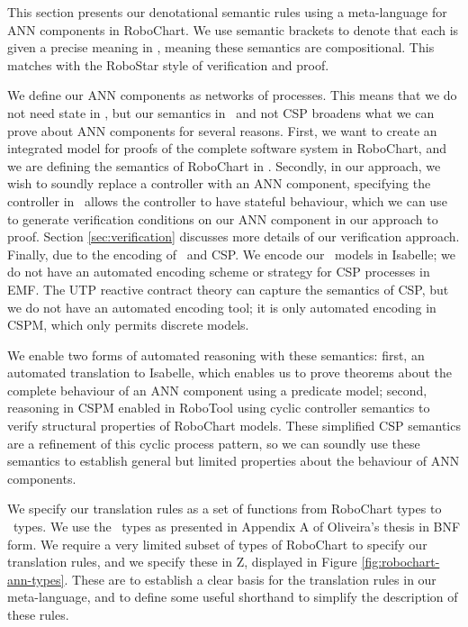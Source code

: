 This section presents our denotational semantic rules using a meta-language for ANN components in RoboChart. We use semantic brackets to denote that each  is given a precise meaning in \Circus, meaning these semantics are compositional. This matches with the RoboStar style of verification and proof. 

We define our ANN components as networks of processes. This means that we do not need state in \Circus, but our semantics in \Circus \  and not CSP broadens what we can prove about ANN components for several reasons. First, we want to create an integrated model for proofs of the complete software system in RoboChart, and we are defining the semantics of RoboChart in \Circus. Secondly, in our approach, we wish to soundly replace a controller with an ANN component, specifying the controller in \Circus \ allows the controller to have stateful behaviour, which we can use to generate verification conditions on our ANN component in our approach to proof. Section \ref{sec:verification} discusses more details of our verification approach. Finally, due to the encoding of \Circus \ and CSP. We encode our \Circus \ models in Isabelle; we do not have an automated encoding scheme or strategy for CSP processes in EMF. The UTP reactive contract theory can capture the semantics of CSP, but we do not have an automated encoding tool; it is only automated encoding in CSPM, which only permits discrete models. 

We enable two forms of automated reasoning with these semantics: first, an automated translation to Isabelle, which enables us to prove theorems about the complete behaviour of an ANN component using a predicate model; second, reasoning in CSPM enabled in RoboTool using cyclic controller semantics to verify structural properties of RoboChart models. These simplified CSP semantics are a refinement of this cyclic process pattern, so we can soundly use these semantics to establish general but limited properties about the behaviour of ANN components. 

We specify our translation rules as a set of functions from RoboChart types to \Circus \ types. We use the \Circus \ types as presented in Appendix A of Oliveira's thesis \cite{Oli06} in BNF form. We require a very limited subset of types of RoboChart to specify our translation rules, and we specify these in Z, displayed in Figure \ref{fig:robochart-ann-types}. These are to establish a clear basis for the translation rules in our meta-language, and to define some useful shorthand to simplify the description of these rules. 

